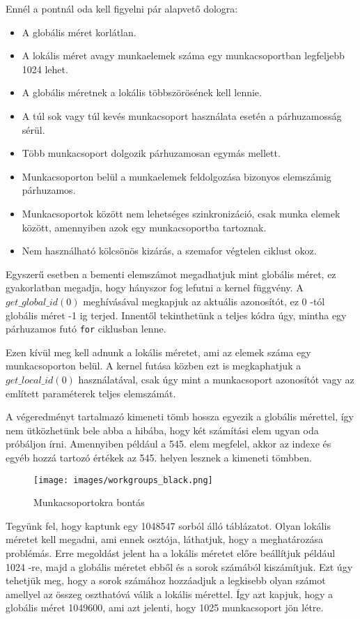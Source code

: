 Ennél a pontnál oda kell figyelni pár alapvető dologra:
\begin{itemize}
\item A globális méret korlátlan.
\item A lokális méret avagy munkaelemek száma egy munkacsoportban legfeljebb 1024 lehet.
\item A globális méretnek a lokális többszörösének kell lennie.
\item A túl sok vagy túl kevés munkacsoport használata esetén a párhuzamosság sérül.
\item Több munkacsoport dolgozik párhuzamosan egymás mellett.
\item Munkacsoporton belül a munkaelemek feldolgozása bizonyos elemszámig párhuzamos.
\item Munkacsoportok között nem lehetséges szinkronizáció, csak munka elemek között, amennyiben azok egy munkacsoportba tartoznak.
\item Nem használható kölcsönös kizárás, a szemafor végtelen ciklust okoz.
\end{itemize}


Egyszerű esetben a bementi elemszámot megadhatjuk mint globális méret, ez gyakorlatban megadja, hogy hányszor fog lefutni a kernel függvény. A $get\_global\_id(0)$ meghívásával megkapjuk az aktuális azonosítót, ez 0 -tól globális méret -1 ig terjed. Innentől tekinthetünk a teljes kódra úgy, mintha egy párhuzamos futó \texttt{for} ciklusban lenne.

Ezen kívül meg kell adnunk a lokális méretet, ami az elemek száma egy munkacsoporton belül. A kernel futása közben ezt is megkaphatjuk a $get\_local\_id(0)$ használatával, csak úgy mint a munkacsoport azonosítót vagy az említett paraméterek teljes elemszámát.

A végeredményt tartalmazó kimeneti tömb hossza egyezik a globális mérettel, így nem ütközhetünk bele abba a hibába, hogy két számítási elem ugyan oda próbáljon írni. Amennyiben például a 545. elem megfelel, akkor az indexe és egyéb hozzá tartozó értékek az 545. helyen lesznek a kimeneti tömbben.

\begin{figure}[h!]
\centering
\texttt{[image: images/workgroups\_black.png]}
\caption{Munkacsoportokra bontás}
\label{fig:opencl}
\end{figure}

Tegyünk fel, hogy kaptunk egy 1048547 sorból álló táblázatot.
Olyan lokális méretet kell megadni, ami ennek osztója, láthatjuk, hogy a meghatározása problémás.
Erre megoldást jelent ha a lokális méretet előre beállítjuk például 1024 -re, majd a globális méretet ebből és a sorok számából kiszámítjuk.
Ezt úgy tehetjük meg, hogy a sorok számához hozzáadjuk a legkisebb olyan számot amellyel az összeg oszthatóvá válik a lokális mérettel.
Így azt kapjuk, hogy a globális méret 1049600, ami azt jelenti, hogy 1025 munkacsoport jön létre. 

